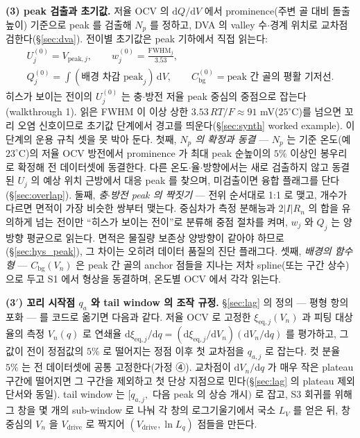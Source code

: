 \documentclass[11pt,a4paper]{article}
\newcommand{\dd}{\mathrm{d}}
\newcommand{\eq}{\mathrm{eq}}
\newcommand{\drive}{\mathrm{drive}}
\newcommand{\bg}{\mathrm{bg}}
\newcommand{\peak}{\mathrm{peak}}
\begin{document}
\textbf{(3) peak 검출과 초기값.} 저율 OCV 의 $\dd Q/\dd V$ 에서 prominence(주변 골 대비 돌출 높이) 기준으로
peak 를 검출해 $N_p$ 를 정하고, DVA 의 valley 수$\cdot$경계 위치로 교차점검한다(\S\ref{sec:dva}). 전이별
초기값은 peak 기하에서 직접 읽는다:
\begin{gather*}
U_j^{(0)}=V_{\peak,j},\qquad w_j^{(0)}=\frac{\mathrm{FWHM}_j}{3.53},\\
Q_j^{(0)}=\int(\text{배경 차감 peak}_j)\,\dd V,\qquad C_\bg^{(0)}=\text{peak 간 골의 평활 기저선}.
\end{gather*}
히스가 보이는 전이의 $U_j^{(0)}$ 는 충$\cdot$방전 저율 peak 중심의 중점으로 잡는다(walkthrough 1). 읽은
FWHM 이 이상 상한 $3.53\,RT/F\approx91$ mV($25^\circ$C)를 넘으면 꼬리 오염 신호이므로 초기값 단계에서 경고를
띄운다(\S\ref{sec:synth} worked example). 이 단계의 운용 규칙 셋을 못 박아 둔다. 첫째, \emph{$N_p$ 의 확정과
동결} — $N_p$ 는 기준 온도(예 $23^\circ$C)의 저율 OCV 방전에서 prominence 가 최대 peak 순높이의 $5\%$ 이상인
봉우리로 확정해 전 데이터셋에 동결한다. 다른 온도$\cdot$율$\cdot$방향에서는 새로 검출하지 않고 동결된 $U_j$ 의
예상 위치 근방에서 대응 peak 를 찾으며, 미검출이면 융합 플래그를 단다(\S\ref{sec:overlap}). 둘째,
\emph{충$\cdot$방전 peak 의 짝짓기} — 전위 순서대로 1:1 로 맺고, 개수가 다르면 면적이 가장 비슷한 쌍부터
맺는다. 중심차가 측정 분해능과 $2|I|R_n$ 의 합을 유의하게 넘는 전이만 ``히스가 보이는 전이''로 분류해 중점
절차를 켜며, $w_j$ 와 $Q_j$ 는 양방향 평균으로 읽는다. 면적은 물질량 보존상 양방향이 같아야 하므로
(\S\ref{sec:hys_peak}), 그 차이는 오히려 데이터 품질의 진단 플래그다. 셋째, \emph{배경의 함수형} —
$C_\bg(V_n)$ 은 peak 간 골의 anchor 점들을 지나는 저차 spline(또는 구간 상수)으로 두고 S1 에서 형상을
동결하며, 온도별 OCV 에서 각각 읽는다.

\textbf{(3$'$) 꼬리 시작점 $q_a$ 와 tail window 의 조작 규정.} \S\ref{sec:lag} 의 정의 — 평형 항의 포화 —
를 코드로 옮기면 다음과 같다. 저율 OCV 로 고정한 $\xi_{\eq,j}(V_n)$ 과 피팅 대상 율의 측정 $V_n(q)$ 로
연쇄율 $\dd\xi_{\eq,j}/\dd q=(\dd\xi_{\eq,j}/\dd V_n)(\dd V_n/\dd q)$ 를 평가하고, 그 값이 전이
정점값의 $5\%$ 로 떨어지는 정점 이후 첫 교차점을 $q_{a,j}$ 로 잡는다. 컷 분율 $5\%$ 는 전 데이터셋에 공통
고정한다(가정 ④). 교차점이 $\dd V_n/\dd q$ 가 매우 작은 plateau 구간에 떨어지면 그 구간을 제외하고 첫 단상
지점으로 민다(\S\ref{sec:lag} 의 plateau 제외 단서와 동일). tail window 는 $[q_{a,j},$ 다음 peak 의 상승
개시$)$ 로 잡고, S3 회귀를 위해 그 창을 몇 개의 sub-window 로 나눠 각 창의 로그기울기에서 국소 $L_V$ 를 얻은
뒤, 창 중심의 $V_n$ 을 $V_\drive$ 로 짝지어 $(V_\drive,\ln L_q)$ 점들을 만든다.
\end{document}
